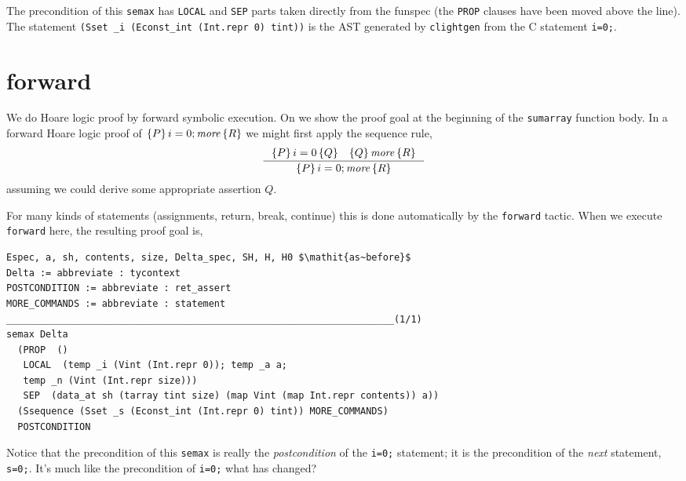 \documentclass[12pt,fleqn,openany,oneside,showtrims]{memoir}
\begin{document}
The precondition of this \lstinline{semax}
has \lstinline{LOCAL} and \lstinline{SEP} parts
taken directly from the funspec (the \lstinline{PROP}
clauses have been moved above the line).
The statement
\lstinline{(Sset _i (Econst_int (Int.repr 0) tint))}
is the AST generated by \lstinline{clightgen}
from the C statement \lstinline{i=0;}.

\chapter{\upshape\textsf{forward}}
We do Hoare logic proof by forward symbolic execution.
On 
we show the proof goal at the beginning of
the \lstinline{sumarray} function body.
In a forward Hoare logic proof
of $\{P\}\,i=0;\mathit{more}\,\{R\}$ we might first apply
the sequence rule,
\[
\inference{\triple{P}{i=0}{Q}\quad
  \triple{Q}{\mathit{more}}{R}}{\triple{P}{i=0;\mathit{more}}{R}}
\]
assuming we could derive some appropriate assertion $Q$.

For many kinds of statements (assignments, return, break,
continue) this is done automatically by the
\lstinline{forward} tactic.  When we execute
\lstinline{forward} here, the resulting proof goal is,

\begin{lstlisting}
Espec, a, sh, contents, size, Delta_spec, SH, H, H0 $\mathit{as~before}$
Delta := abbreviate : tycontext
POSTCONDITION := abbreviate : ret_assert
MORE_COMMANDS := abbreviate : statement
_____________________________________________________________________(1/1)
semax Delta
  (PROP  ()
   LOCAL  (temp _i (Vint (Int.repr 0)); temp _a a;
   temp _n (Vint (Int.repr size)))
   SEP  (data_at sh (tarray tint size) (map Vint (map Int.repr contents)) a))
  (Ssequence (Sset _s (Econst_int (Int.repr 0) tint)) MORE_COMMANDS)
  POSTCONDITION
\end{lstlisting}
Notice that the precondition of this \lstinline{semax}
is really the \emph{postcondition} of the
\lstinline{i=0;} statement; it is the precondition
of the \emph{next} statement, \lstinline{s=0;}.
It's much like the precondition of
\lstinline{i=0;} what has changed?
\end{document}
